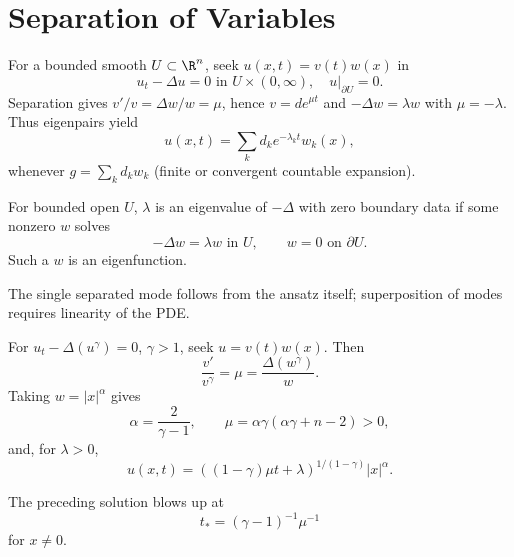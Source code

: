\section{Separation of Variables}
\label{sec:separation-of-variables}

\begin{example}
\label{ex:heat-equation-separation-of-variables}
For a bounded smooth $U\subset\R^n$, seek $u(x,t)=v(t)w(x)$ in
\[
u_t-\Delta u=0\text{ in }U\times(0,\infty),\quad u|_{\partial U}=0.
\]
Separation gives $v'/v=\Delta w/w=\mu$, hence $v=de^{\mu t}$ and
$-\Delta w=\lambda w$ with $\mu=-\lambda$. Thus eigenpairs yield
\[
u(x,t)=\sum_k d_ke^{-\lambda_kt}w_k(x),
\]
whenever $g=\sum_kd_kw_k$ (finite or convergent countable expansion).
\end{example}

\begin{definition}
\label{def:eigenvalue-eigenfunction}
For bounded open $U$, $\lambda$ is an eigenvalue of $-\Delta$ with zero
boundary data if some nonzero $w$ solves
\[
-\Delta w=\lambda w\text{ in }U,\qquad w=0\text{ on }\partial U.
\]
Such a $w$ is an eigenfunction.
\end{definition}

\begin{remark}
\label{rem:separation-of-variables-linearity-remark}
The single separated mode follows from the ansatz itself; superposition of
modes requires linearity of the PDE.
\end{remark}

\begin{example}
\label{ex:porous-medium-separation-of-variables}
For $u_t-\Delta(u^\gamma)=0$, $\gamma>1$, seek $u=v(t)w(x)$. Then
\[
\frac{v'}{v^\gamma}=\mu=\frac{\Delta(w^\gamma)}{w}.
\]
Taking $w=|x|^\alpha$ gives
\[
\alpha=\frac{2}{\gamma-1},\qquad
\mu=\alpha\gamma(\alpha\gamma+n-2)>0,
\]
and, for $\lambda>0$,
\[
u(x,t)=((1-\gamma)\mu t+\lambda)^{1/(1-\gamma)}|x|^\alpha.
\]
\end{example}

\begin{remark}
\label{rem:porous-medium-blowup-remark}
The preceding solution blows up at
\[
t_*=(\gamma-1)^{-1}\mu^{-1}
\]
for $x\ne0$.
\end{remark}

